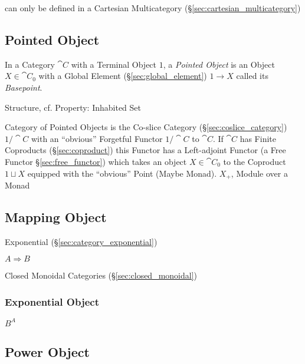 can only be defined in a Cartesian Multicategory
(\S\ref{sec:cartesian_multicategory})



\subsection{Pointed Object}\label{sec:pointed_object}

In a Category $\cat{C}$ with a Terminal Object $1$, a \emph{Pointed
  Object} is an Object $X \in \cat{C}_0$ with a Global Element
(\S\ref{sec:global_element}) $1 \rightarrow X$ called its
\emph{Basepoint}.

Structure, cf. Property: Inhabited Set %

Category of Pointed Objects is the Co-slice Category
(\S\ref{sec:coslice_category}) $1/\cat{C}$ with an ``obvious''
Forgetful Functor $1 / \cat{C}$ to $\cat{C}$. If $\cat{C}$ has Finite
Coproducts (\S\ref{sec:coproduct}) this Functor has a Left-adjoint
Functor (a Free Functor \S\ref{sec:free_functor}) which takes an
object $X \in \cat{C}_0$ to the Coproduct $1 \sqcup X$ equipped with
the ``obvious'' Point (Maybe Monad). $X_+$, Module over a Monad %



\subsection{Mapping Object}\label{sec:mapping_object}

Exponential (\S\ref{sec:category_exponential})

$A \Rightarrow B$

Closed Monoidal Categories (\S\ref{sec:closed_monoidal})



\subsubsection{Exponential Object}\label{sec:exponential_object}

$B^A$



\subsection{Power Object}\label{sec:power_object}

